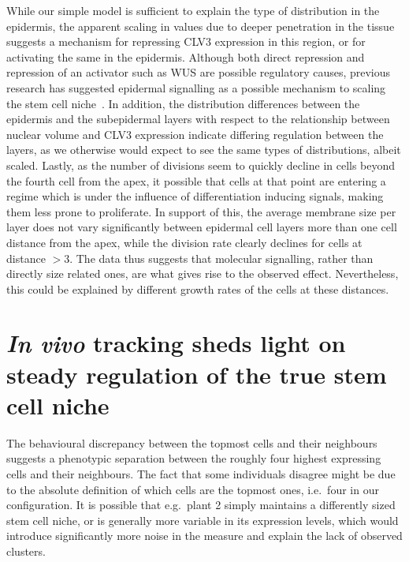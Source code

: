 While our simple model is sufficient to explain the type of distribution in the
epidermis, the apparent scaling in values due to deeper penetration in the
tissue suggests a mechanism for repressing CLV3 expression in this region, or
for activating the same in the epidermis. Although
both direct repression and repression of an activator such as WUS are
possible regulatory causes, previous research has suggested epidermal
signalling as a possible mechanism to scaling the stem cell
niche~\cite{gruel2016epidermis}. In addition, the
distribution differences between the epidermis and the subepidermal layers with
respect to the relationship between nuclear volume and CLV3 expression indicate
differing regulation between the layers, as we otherwise would expect to see the
same types of distributions, albeit scaled. Lastly, as the number of divisions seem to
quickly decline in cells beyond the fourth cell from the apex, it possible that
cells at that point are entering a regime which is under the influence of
differentiation  inducing signals, making them less prone to proliferate. In
support of this, the average membrane size per layer does not vary
significantly between epidermal cell layers more than one cell distance from the apex, 
while the division rate clearly declines for cells at distance $>3$. The data
thus suggests that molecular signalling, rather than directly size related ones, 
are what gives rise to the observed effect. Nevertheless, this could be
explained by different growth rates of the cells at these distances.

\section{\textit{In vivo} tracking sheds light on steady regulation of the true stem
  cell niche}
The behavioural discrepancy between the topmost cells and their
neighbours suggests a phenotypic separation between the roughly four highest
expressing cells and their neighbours. The fact
that some individuals disagree  might be due to the
absolute definition of which cells are the topmost ones, i.e.\ four in our
configuration. It is possible that e.g.\ plant 2 simply maintains a differently sized
stem cell niche, or is generally more variable in its expression levels, which
would introduce significantly more noise in the measure and explain the lack of
observed clusters.  

